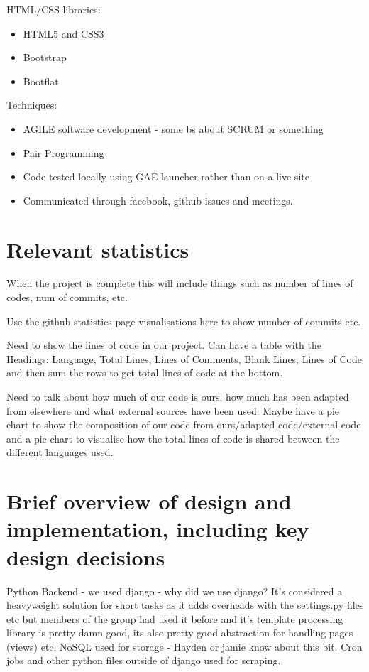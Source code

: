 \documentclass[12pt, a4paper]{article}
\begin{document}
HTML/CSS libraries:
\begin{itemize}
\item HTML5 and CSS3
\item Bootstrap
\item Bootflat
\end{itemize}

Techniques:
\begin{itemize}
\item AGILE software development - some bs about SCRUM or something
\item Pair Programming
\item Code tested locally using GAE launcher rather than on a live site
\item Communicated through facebook, github issues and meetings.
\end{itemize}

\newpage
\section{Relevant statistics}

When the project is complete this will include things such as number of lines of codes, num of commits, etc.

Use the github statistics page visualisations here to show number of commits etc.

Need to show the lines of code in our project. Can have a table with the Headings: Language, Total Lines, Lines of Comments, Blank Lines, Lines of Code and then sum the rows to get total lines of code at the bottom.

Need to talk about how much of our code is ours, how much has been adapted from elsewhere and what external sources have been used. Maybe have a pie chart to show the composition of our code from ours/adapted code/external code and a pie chart to visualise how the total lines of code is shared between the different languages used.


\newpage
\section{Brief overview of design and implementation, including key design decisions}
Python Backend - we used django - why did we use django? It's considered a heavyweight solution for short tasks as it adds overheads with the settings.py files etc but members of the group had used it before and it's template processing library is pretty damn good, its also pretty good abstraction for handling pages (views) etc. NoSQL used for storage - Hayden or jamie know about this bit. Cron jobs and other python files outside of django used for scraping. 
\end{document}
